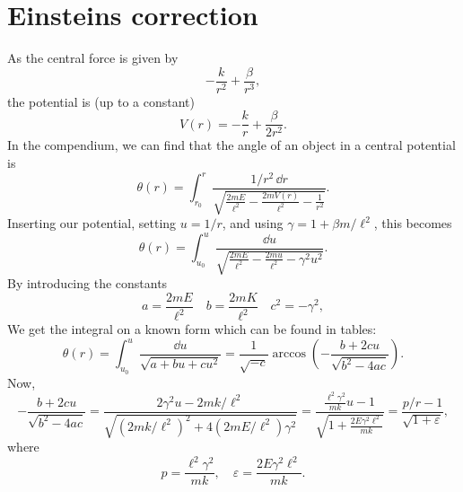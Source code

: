 \documentclass{article}
\begin{document}
    \section{Einsteins correction}
        As the central force is given by
        \begin{equation*}
            - \frac{k}{r^2} + \frac{\beta}{r^3},
        \end{equation*}
        the potential is (up to a constant)
        \begin{equation*}
            V(r) = - \frac{k}{r} + \frac{\beta}{2 r^2}.
        \end{equation*}
        In the compendium, we can find that the angle of an object in a central potential is
        \begin{equation*}
            \theta(r) = \int_{r_0}^r \frac{1 / r^2 \, \dd r}{\sqrt{\frac{2 m E}{\ell^2} - \frac{2 m V(r)}{\ell^2} - \frac{1}{r^2}}}.
        \end{equation*}
        Inserting our potential, setting $u = 1/r$, and using $\gamma = 1 + \beta m / \ell^2$, this becomes
        \begin{equation*}
            \theta(r) = \int_{u_0}^u \frac{\dd u}{\sqrt{\frac{2 m E}{\ell^2} - \frac{2 m u}{\ell^2} - \gamma^2 u^2}}.
        \end{equation*}
        By introducing the constants
        \begin{equation*}
            a = \frac{2mE}{\ell^2}\quad b = \frac{2 m K}{\ell^2} \quad c^2 = -\gamma^2,
        \end{equation*}
        We get the integral on a known form which can be found in tables:
        \begin{equation*}
            \theta(r) = \int_{u_0}^u \frac{\dd u}{\sqrt{a + b u + c u^2}} = \frac{1}{\sqrt{-c}} \arccos \left(-\frac{b + 2c u}{\sqrt{b^2 - 4 a c}}\right).
        \end{equation*}
        Now,
        \begin{equation*}
            -\frac{b + 2c u}{\sqrt{b^2 - 4 a c}} = \frac{2\gamma^2u - 2mk/\ell^2}{\sqrt{\left(2 mk/\ell^2\right)^2 + 4\left(2mE/\ell^2\right)\gamma^2}} 
            = \frac{\frac{\ell^2 \gamma^2}{mk}u - 1}{\sqrt{1 + \frac{2E\gamma^2 \ell^2}{mk}}} = \frac{p / r - 1}{\sqrt{1 + \varepsilon}},
        \end{equation*}
        where
        \begin{equation*}
            p = \frac{\ell^2 \gamma^2}{mk}, \quad  \varepsilon = \frac{2E\gamma^2 \ell^2}{mk}.
        \end{equation*}
\end{document}
